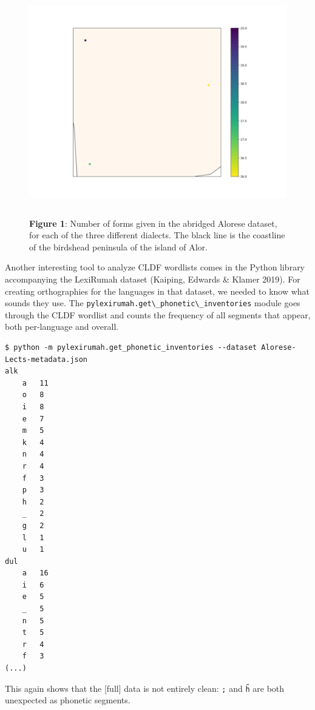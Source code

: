 \documentclass[
  a4paper,
  14pt,
  oneside,
  tablecaptionabove
]{scrbook}
\newcommand{\passthrough}[1]{#1}
\begin{document}
\begin{figure}
\centering
\includegraphics[width=5.20833in,height=3.90625in]{images/__f-origin.hypotheses.org_wp-content_blogs.dir_4500_files_2018_11_alorese-500x375.png}
\captionsetup{labelformat=empty}
\caption{\textbf{Figure 1}: Number of forms given in the abridged Alorese dataset, for each
of the three different dialects. The black line is the coastline of the
birdshead peninsula of the island of Alor.}
\end{figure}

Another interesting tool to analyze CLDF wordlists comes in the Python
library accompanying the LexiRumah dataset (Kaiping, Edwards \& Klamer
2019). For creating orthographies for the languages in that dataset, we
needed to know what sounds they use. The
\passthrough{\lstinline!pylexirumah.get\_phonetic\_inventories!} module
goes through the CLDF wordlist and counts the frequency of all segments
that appear, both per-language and overall.

\begin{lstlisting}
$ python -m pylexirumah.get_phonetic_inventories --dataset Alorese-Lects-metadata.json
alk
    a   11
    o   8
    i   8
    e   7
    m   5
    k   4
    n   4
    r   4
    f   3
    p   3
    h   2
    _   2
    g   2
    l   1
    u   1
dul
    a   16
    i   6
    e   5
    _   5
    n   5
    t   5
    r   4
    f   3
(...)
\end{lstlisting}

This again shows that the [full] data is not entirely clean:
\texttt{;} and \texttt{h̃} are both
unexpected as phonetic segments.
\end{document}
